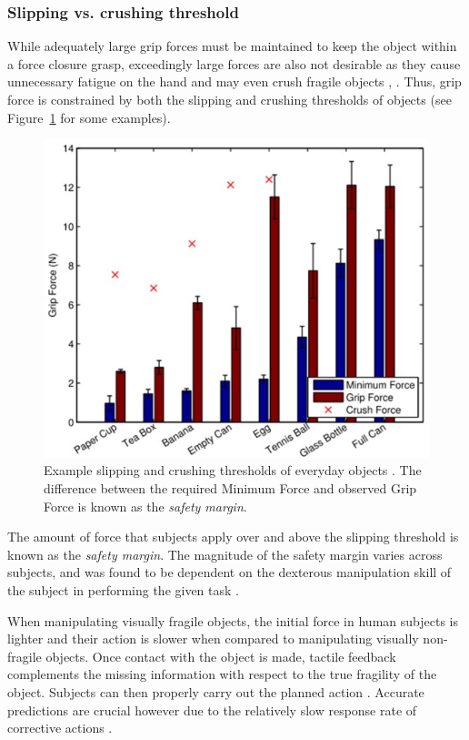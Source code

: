 \subsubsection*{Slipping vs. crushing threshold}
While adequately large grip forces must be maintained to keep the object within a force closure grasp, exceedingly large forces are also not desirable as they cause unnecessary fatigue on the hand and may even crush fragile objects \cite{johansson1994grasp}, \cite{gorniak2010manipulation}.
Thus, grip force is constrained by both the slipping and crushing thresholds of objects (see Figure~\ref{fig:grip_crush_force} for some examples).

\begin{figure}[]
	\centering
	\includegraphics[width=\linewidth]{images/grip_crush_force}
	\caption{Example slipping and crushing thresholds of everyday objects \cite{romano2011human}. The difference between the required Minimum Force and observed Grip Force is known as the \emph{safety margin}.}
	\label{fig:grip_crush_force}
\end{figure}

The amount of force that subjects apply over and above the slipping threshold is known as the \emph{safety margin}.
The magnitude of the safety margin varies across subjects, and was found to be dependent on the dexterous manipulation skill of the subject in performing the given task \cite{Johansson1984}.

When manipulating visually fragile objects, the initial force in human subjects is lighter and their action is slower when compared to manipulating visually non-fragile objects.
Once contact with the object is made, tactile feedback complements the missing information with respect to the true fragility of the object. 
Subjects can then properly carry out the planned action \cite{chinellato2008visual}.
Accurate predictions are crucial however due to the relatively slow response rate of corrective actions \cite{johansson2009coding}.

